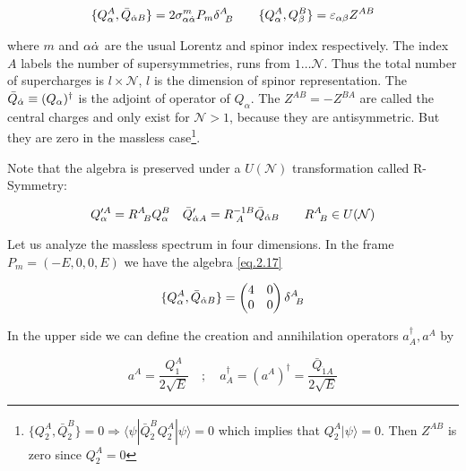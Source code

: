 \begin{equation}
\{Q_{\alpha}^{A},\bar{Q}_{\dot{\alpha} B}\} = 2 \sigma_{\alpha \dot{\alpha}}^{m}P_{m} \delta^{A}_{\;\;B} \quad \quad \{Q_{\alpha}^{A},Q_{\beta}^{B}\} = \varepsilon_{\alpha\beta} Z^{AB} 
\label{eq.2.17}
\end{equation}


where $m$ and $\alpha \dot{\alpha}$ are the usual Lorentz and spinor index respectively. The index $A$
labels the number of supersymmetries, runs from $1 \dots \mathcal{N}$. Thus the total number of supercharges is $l \times \mathcal{N}$, $l$ is the dimension of spinor representation. The $\bar{Q}_{\dot{\alpha}}  \equiv (Q_{\alpha})^{\dagger} $ is the adjoint of operator of $Q_{\alpha}$. The $Z^{AB} = -Z^{BA} $ are called the central charges and only exist for $\mathcal{N} > 1$, because they are antisymmetric. But they are zero in the massless case\footnote{$\{Q_{2}^{A},\bar{Q}_{\dot{2}}^{B}  \} =0 \Rightarrow \langle\psi |\bar{Q}_{\dot{2}}^{B} Q_{2}^{A} |\psi \rangle  =0 $ which implies that $Q_{2}^{A} |\psi \rangle  =0$. Then $Z^{AB}$ is zero since $Q_{2}^{A}=0$ }.

Note that the algebra is preserved under a $U(\mathcal{N})$ transformation called R-Symmetry:

\begin{equation}
Q_{\alpha}^{\prime A} = R^{A}_{\;\;B}Q_{\alpha}^{B} \quad \bar{Q}_{\dot{\alpha} A}^{\prime } = R^{-1 B}_{\;A}\bar{Q}_{\dot{\alpha} B} \quad  \quad R^{A}_{\;\;B}  \in U(\mathcal{N})
\end{equation}

Let us analyze the massless spectrum in four dimensions. In the frame $P_{m} = (-E,0,0,E)$ we have the algebra \eqref{eq.2.17}

\begin{equation}
\{Q_{\alpha}^{A},\bar{Q}_{\dot{\alpha} B}\} = \begin{pmatrix} 
4 & 0\\
0 & 0  
\end{pmatrix} \delta^{A}_{\;\;B} 
\end{equation}




In the upper side we can define the creation and annihilation operators $a^{\dagger}_{A},a^{A}$ by 

\begin{equation}
a^{A} = \frac{Q_{1}^{A}}{2\sqrt{E}} \quad ; \quad a^{\dagger}_{A} = (a^{A})^{\dagger} = \frac{\bar{Q}_{\dot{1}A}}{2\sqrt{E}}
\end{equation}



